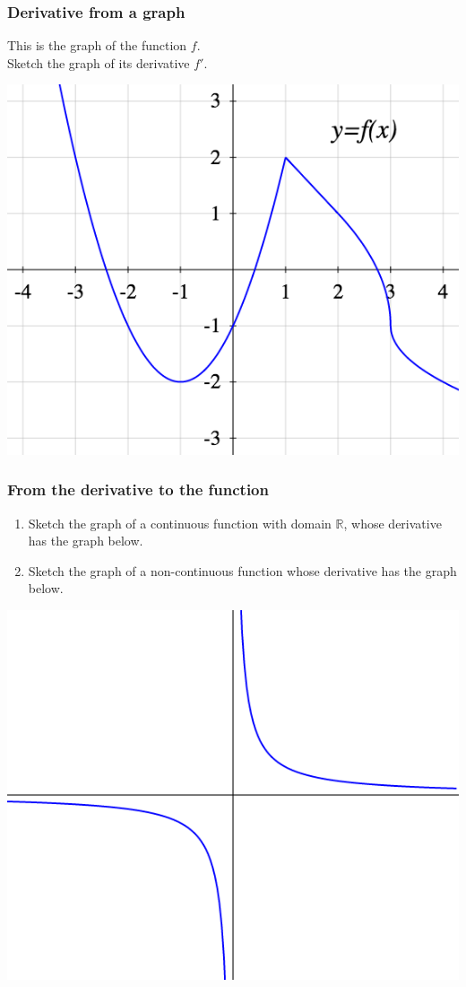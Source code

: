 \begin{frame}[t]
	\frametitle{Derivative from a graph}
	This is the graph of the function $f$. \\ Sketch the graph of its derivative
	$f'$.
	\begin{center}
		\includegraphics[scale=.4]{G4}
	\end{center}
\end{frame}

\begin{frame}[t]
	\frametitle{From the derivative to the function}

	\begin{enumerate}
		\item Sketch the graph of a continuous function with domain $\mathbb{R}$,
			whose derivative has the graph below.

		\item Sketch the graph of a non-continuous function whose derivative has the
			graph below.
	\end{enumerate}

	\begin{center}
		\includegraphics[scale=.3]{G5}
	\end{center}
\end{frame}

